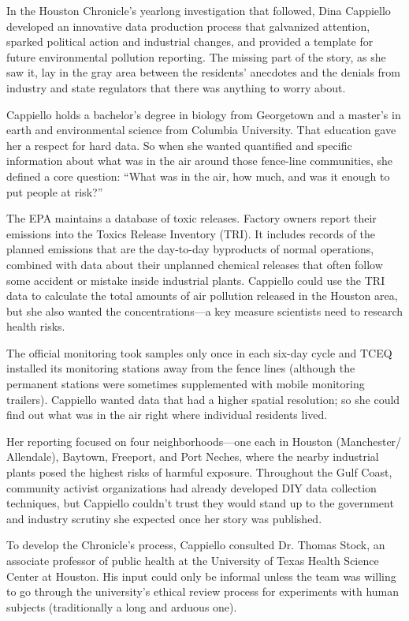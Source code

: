 In the Houston Chronicle's yearlong investigation that followed, Dina Cappiello
developed an innovative data production process that galvanized
attention, sparked political action and industrial changes, and provided a
template for future environmental pollution reporting. The missing part of
the story, as she saw it, lay in the gray area between the residents' anecdotes
and the denials from industry and state regulators that there was anything
to worry about.

Cappiello holds a bachelor's degree in biology from Georgetown and a master's
in earth and environmental science from Columbia University. That
education gave her a respect for hard data. So when she wanted quantified
and specific information about what was in the air around those fence-line
communities, she defined a core question: ``What was in the air, how much,
and was it enough to put people at risk?''

The EPA maintains a database of toxic releases. Factory owners report their
emissions into the Toxics Release Inventory (TRI). It includes records of the
planned emissions that are the day-to-day byproducts of normal operations,
combined with data about their unplanned chemical releases that often follow
some accident or mistake inside industrial plants. Cappiello could use
the TRI data to calculate the total amounts of air pollution released in the
Houston area, but she also wanted the concentrations—a key measure scientists
need to research health risks.

The official monitoring took samples only once in each six-day cycle and
TCEQ installed its monitoring stations away from the fence lines (although
the permanent stations were sometimes supplemented with mobile
monitoring trailers). Cappiello wanted data that had a higher spatial resolution;
so she could find out what was in the air right where individual
residents lived.

Her reporting focused on four neighborhoods—one each in Houston (Manchester/
Allendale), Baytown, Freeport, and Port Neches, where the nearby
industrial plants posed the highest risks of harmful exposure. Throughout
the Gulf Coast, community activist organizations had already developed DIY data collection techniques, but Cappiello couldn't trust they would
stand up to the government and industry scrutiny she expected once her
story was published. 

To develop the Chronicle's process, Cappiello consulted Dr. Thomas Stock,
an associate professor of public health at the University of Texas Health Science
Center at Houston. His input could only be informal unless the team
was willing to go through the university's ethical review process for experiments
with human subjects (traditionally a long and arduous one).

